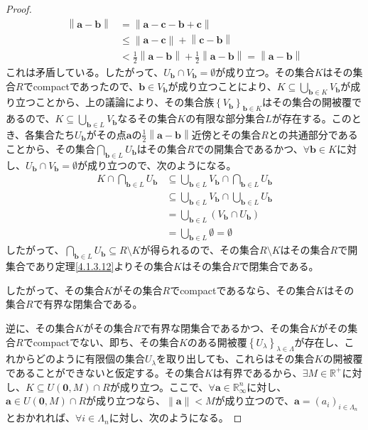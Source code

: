 \documentclass[dvipdfmx]{jsarticle}
\begin{document}
\begin{proof}
\begin{align*}
\left\| \mathbf{a} - \mathbf{b} \right\| &= \left\| \mathbf{a} - \mathbf{c} - \mathbf{b} + \mathbf{c} \right\|\\
&\leq \left\| \mathbf{a} - \mathbf{c} \right\| + \left\| \mathbf{c} - \mathbf{b} \right\|\\
&< \frac{1}{2}\left\| \mathbf{a} - \mathbf{b} \right\| + \frac{1}{2}\left\| \mathbf{a} - \mathbf{b} \right\| = \left\| \mathbf{a} - \mathbf{b} \right\|
\end{align*}
これは矛盾している。したがって、$U_{\mathbf{b}} \cap V_{\mathbf{b}} = \emptyset$が成り立つ。その集合$K$はその集合$R$でcompactであったので、$\mathbf{b} \in V_{\mathbf{b}}$が成り立つことにより、$K \subseteq \bigcup_{\mathbf{b} \in K} V_{\mathbf{b}}$が成り立つことから、上の議論により、その集合族$\left\{ V_{\mathbf{b}} \right\}_{\mathbf{b} \in K}$はその集合の開被覆であるので、$K \subseteq \bigcup_{\mathbf{b} \in L} V_{\mathbf{b}}$なるその集合$K$の有限な部分集合$L$が存在する。このとき、各集合たち$U_{\mathbf{b}}$がその点$\mathbf{a}$の$\frac{1}{2}\left\| \mathbf{a} - \mathbf{b} \right\|$近傍とその集合$R$との共通部分であることから、その集合$\bigcap_{\mathbf{b} \in L} U_{\mathbf{b}}$はその集合$R$での開集合であるかつ、$\forall\mathbf{b} \in K$に対し、$U_{\mathbf{b}} \cap V_{\mathbf{b}} = \emptyset$が成り立つので、次のようになる。
\begin{align*}
K \cap \bigcap_{\mathbf{b} \in L} U_{\mathbf{b}} &\subseteq \bigcup_{\mathbf{b} \in L} V_{\mathbf{b}} \cap \bigcap_{\mathbf{b} \in L} U_{\mathbf{b}}\\
&\subseteq \bigcup_{\mathbf{b} \in L} V_{\mathbf{b}} \cap \bigcup_{\mathbf{b} \in L} U_{\mathbf{b}}\\
&= \bigcup_{\mathbf{b} \in L} \left( V_{\mathbf{b}} \cap U_{\mathbf{b}} \right)\\
&= \bigcup_{\mathbf{b} \in L} \emptyset = \emptyset
\end{align*}
したがって、$\bigcap_{\mathbf{b} \in L} U_{\mathbf{b}} \subseteq R \setminus K$が得られるので、その集合$R \setminus K$はその集合$R$で開集合であり定理\ref{4.1.3.12}よりその集合$K$はその集合$R$で閉集合である。\par
したがって、その集合$K$がその集合$R$でcompactであるなら、その集合$K$はその集合$R$で有界な閉集合である。\par
逆に、その集合$K$がその集合$R$で有界な閉集合であるかつ、その集合$K$がその集合$R$でcompactでない、即ち、その集合$K$のある開被覆$\left\{ U_{\lambda} \right\}_{\lambda \in \varLambda}$が存在し、これからどのように有限個の集合$U_{\lambda}$を取り出しても、これらはその集合$K$の開被覆であることができないと仮定する。その集合$K$は有界であるから、$\exists M \in \mathbb{R}^{+}$に対し、$K \subseteq U\left( \mathbf{0},M \right) \cap R$が成り立つ。ここで、$\forall\mathbf{a} \in \mathbb{R}_{\infty}^{n}$に対し、$\mathbf{a} \in U\left( \mathbf{0},M \right) \cap R$が成り立つなら、$\left\| \mathbf{a} \right\| < M$が成り立つので、$\mathbf{a} = \left( a_{i} \right)_{i \in \varLambda_{n}}$とおかれれば、$\forall i \in \varLambda_{n}$に対し、次のようになる。

\end{proof}
\end{document}
